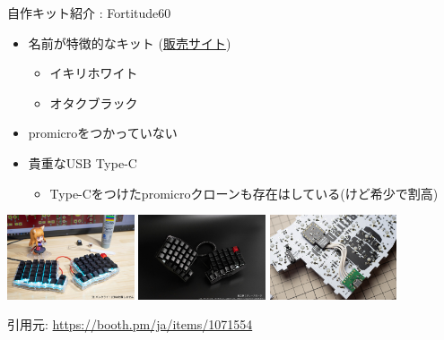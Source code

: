\documentclass[cjk,dvipdfmx,10pt,compress,fragile%
hyperref={bookmarks=true,bookmarksnumbered=true,bookmarksopen=false,%
colorlinks=false,%
pdftitle={第 134 回 関西 Debian 勉強会},%
pdfauthor={小林},%
pdfsubject={資料},%
}]{beamer}
\begin{document}
\begin{frame}[fragile,t]{自作キット紹介 : Fortitude60}
 \begin{itemize}
  \item 名前が特徴的なキット (\href{https://yushakobo.jp/shop/fortitude60/}{販売サイト})
	\begin{itemize}
	 \item イキリホワイト
	 \item オタクブラック
	\end{itemize}
  \item promicroをつかっていない
  \item 貴重なUSB Type-C
	\begin{itemize}
	 \item Type-Cをつけたpromicroクローンも存在はしている(けど希少で割高)
	\end{itemize}
 \end{itemize}
 \begin{center}
  \includegraphics[keepaspectratio,height=2.5cm]{./img/fortitude60-ikiri.jpg}
  \hspace*{.5zw}
  \includegraphics[keepaspectratio,height=2.5cm]{./img/fortitude60-otaku.jpg}
  \hspace*{.5zw}
  \includegraphics[keepaspectratio,height=2.5cm]{./img/fortitude60-typec.jpg}
 \end{center}
 \vspace*{-1zw}
 \begin{flushright}
  {\footnotesize
  引用元: \url{https://booth.pm/ja/items/1071554}}
 \end{flushright}
\end{frame}
\end{document}
